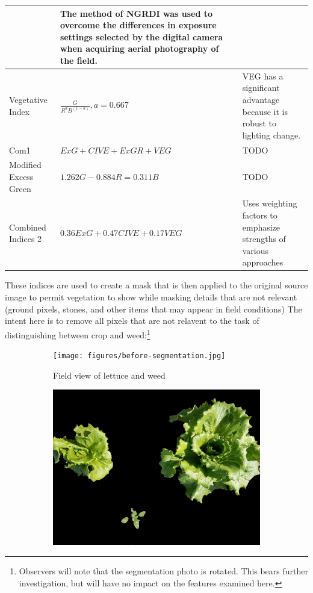 \documentclass[letterpaper]{article}
\begin{document}
{\begin{table}[H]
\begin{tabular}{  l  p{4cm}  p{5cm} }
& The method of NGRDI was used to overcome the differences in exposure settings selected by the digital camera when acquiring aerial photography of the field. \\\hline
Vegetative Index      
& $\frac {G} {R^aB^{(1-a)}}, a = 0.667$ 
& VEG has a significant advantage because it is robust to lighting change.\\\hline
Com1   
& $ExG + CIVE + ExGR + VEG$ 
& TODO \\\hline
Modified Excess Green      
& $1.262G - 0.884R = 0.311B$ 
& TODO \\\hline
Combined Indices 2      
& $0.36ExG + 0.47CIVE + 0.17VEG$ 
& Uses weighting factors to emphasize strengths of various approaches\\\hline    

        \bottomrule
    \end{tabular}
\end{table}
These indices are used to create a mask that is then applied to the original source image to permit vegetation to show while masking details that are not relevant (ground pixels, stones, and other items that may appear in field conditions) The intent here is to remove all pixels that are not relavent to the task of distinguishing between crop and weed:\footnote{Observers will note that the segmentation photo is rotated. This bears further investigation, but will have no impact on the features examined here.}
\begin{figure}[H]
\centering
\begin{subfigure}[]{.32\textwidth}
  \centering
  \texttt{[image: figures/before-segmentation.jpg]}
  \caption{Field view of lettuce and weed}
  \label{fig:sub1}
\end{subfigure}
\begin{subfigure}{.32\textwidth}
  \centering
  \includegraphics[width=1\linewidth]{figures/after-segmentation.jpg}

\end{subfigure}
\end{figure}}
\end{document}
